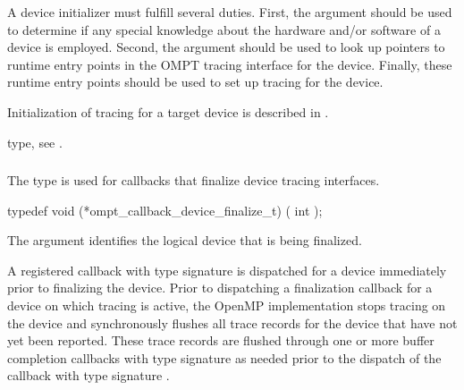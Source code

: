\effect
A device initializer must fulfill several duties. First, the  
argument should be used to determine if any special knowledge about the 
hardware and/or software of a device is employed. Second, the  
argument should be used to look up pointers to runtime entry points in the 
OMPT tracing interface for the device. Finally, these runtime entry points
should be used to set up tracing for the device.

Initialization of tracing for a target device is described in 
.

\begin{crossrefs}
\item {} type, see .
\end{crossrefs}



\subsubsection{}
\label{sec:ompt_callback_device_finalize_t}

\summary 
The  type is used for callbacks that 
finalize device tracing interfaces.

\format
\begin{ccppspecific}
\begin{omptCallback}
typedef void (*ompt_callback_device_finalize_t) (
  int 
);
\end{omptCallback}
\end{ccppspecific}

\argdesc
The  argument identifies the logical device that is being finalized.

\descr
A registered callback with type signature  
is dispatched for a device immediately prior to finalizing the device. Prior to 
dispatching a finalization callback for a device on which tracing is active,
the OpenMP implementation stops tracing on the device and synchronously flushes 
all trace records for the device that have not yet been reported. These trace 
records are flushed through one or more buffer completion callbacks with type 
signature  as needed prior to the dispatch
of the callback with type signature .

